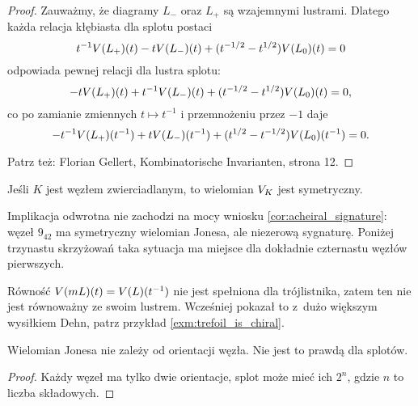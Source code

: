 \begin{proof}
    Zauważmy, że diagramy $L_-$ oraz $L_+$ są wzajemnymi lustrami.
    Dlatego każda relacja kłębiasta dla splotu postaci
    \begin{equation}
        t^{-1} V(L_+)(t) - tV(L_-)(t) + (t^{-1/2} - t^{1/2}) V(L_0)(t) = 0
    \end{equation}
    odpowiada pewnej relacji dla lustra splotu:
    \begin{equation}
        -tV(L_+)(t) + t^{-1} V(L_-)(t) + (t^{-1/2} - t^{1/2}) V(L_0)(t) = 0,
    \end{equation}
    co po zamianie zmiennych $t \mapsto t^{-1}$ i przemnożeniu przez $-1$ daje
    \begin{equation}
        -t^{-1} V(L_+)(t^{-1}) + t V(L_-)(t^{-1}) + (t^{1/2} - t^{-1/2}) V(L_0)(t^{-1}) = 0.
    \end{equation}

    Patrz też: Florian Gellert, Kombinatorische Invarianten, strona 12.
\end{proof}

\begin{corollary}
    \label{cor:joines_of_amphicheiral}
    Jeśli $K$ jest węzłem zwierciadlanym, to wielomian $V_K$ jest symetryczny.
\end{corollary}

Implikacja odwrotna nie zachodzi na mocy wniosku \ref{cor:acheiral_signature}: węzeł $9_{42}$ ma symetryczny wielomian Jonesa, ale niezerową sygnaturę.
Poniżej trzynastu skrzyżowań taka sytuacja ma miejsce dla dokładnie czternastu węzłów pierwszych.

Równość $V(mL)(t)=V(L)(t^{-1})$ nie jest spełniona dla trójlistnika, zatem ten nie jest równoważny ze swoim lustrem.
Wcześniej pokazał to z~dużo większym wysiłkiem Dehn, patrz przykład \ref{exm:trefoil_is_chiral}.

\begin{corollary}
    Wielomian Jonesa nie zależy od orientacji węzła.
    Nie jest to prawdą dla splotów.
\end{corollary}

\begin{proof}
    Każdy węzeł ma tylko dwie orientacje, splot może mieć ich $2^n$, gdzie $n$ to liczba składowych.
\end{proof}

